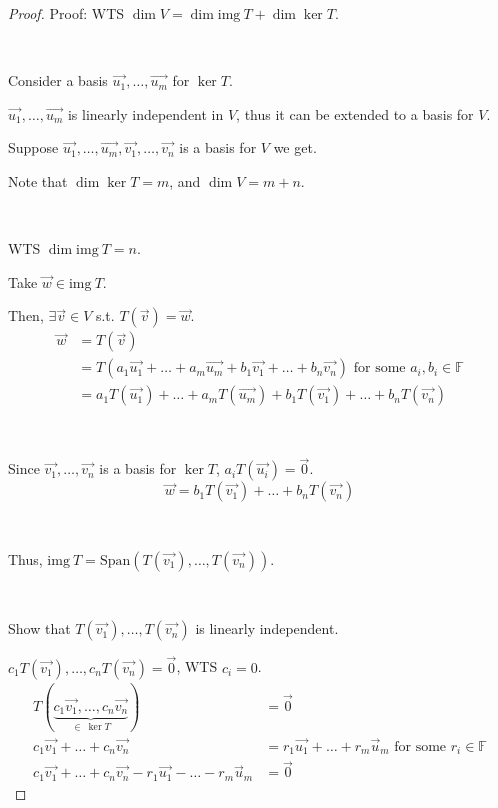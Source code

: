 \documentclass[11pt,fleqn]{book} %
\begin{document}
\begin{proof}
    Proof: WTS $\dim V = \dim \mathrm{img}~T + \dim \ker T$. 

    {~~~}
    
    Consider a basis $\overrightarrow{u_1}, \dots, \overrightarrow{u_m}$ for $\ker T$. 
    
    $\overrightarrow{u_1}, \dots, \overrightarrow{u_m}$ is linearly independent in $V$, thus it can be extended to a basis for $V$. 
    
    Suppose $\overrightarrow{u_1}, \dots, \overrightarrow{u_m}, \overrightarrow{v_1}, \dots, \overrightarrow{v_n}$ is a basis for $V$ we get. 

    Note that $\dim \ker T = m$, and $\dim V = m + n$. 
    
    {~~~}

    WTS $\dim \mathrm{img}~T = n$. 
    
    Take $\overrightarrow{w} \in \mathrm{img}~T$. 
    
    Then, $\exists \overrightarrow{v} \in V$ s.t. $T(\overrightarrow{v}) = \overrightarrow{w}$. 
    \begin{align*}  
        \overrightarrow{w}
        &=T(\overrightarrow{v})
        \\
        &= T(a_1\overrightarrow{u_1} + \dots + a_m\overrightarrow{u_m} + b_1\overrightarrow{v_1} + \dots + b_n\overrightarrow{v_n})
        \text{ for some }a_i, b_i \in \mathbb{F}
        \\
        &= a_1T(\overrightarrow{u_1}) + \dots + a_mT(\overrightarrow{u_m}) + b_1T(\overrightarrow{v_1}) + \dots + b_nT(\overrightarrow{v_n})
    \end{align*}
    
    {~~~}

    Since $\overrightarrow{v_1}, \dots, \overrightarrow{v_n}$ is a basis for $\ker T$, $a_iT(\overrightarrow{u_i}) = \overrightarrow{0}$. 
    $$\overrightarrow{w} = b_1T(\overrightarrow{v_1}) + \dots + b_nT(\overrightarrow{v_n})$$

    {~~~}

    Thus, $\mathrm{img}~T = \mathrm{Span}\left( T(\overrightarrow{v_1}), \dots, T(\overrightarrow{v_n}) \right)$. 

    {~~~}

    Show that $T(\overrightarrow{v_1}), \dots, T(\overrightarrow{v_n})$ is linearly independent. 
    
    $c_1 T(\overrightarrow{v_1}), \dots, c_nT(\overrightarrow{v_n}) = \overrightarrow{0}$, WTS $c_i = 0$. 
    \begin{align*}
        T ( \underbrace{c_1\overrightarrow{v_1}, \dots, c_n\overrightarrow{v_n}}_{\in~\ker T} ) 
        &= \overrightarrow{0}
        \\
        c_1\overrightarrow{v_1} + \dots + c_n\overrightarrow{v_n} 
        &= r_1\overrightarrow{u_1} + \dots + r_m\overrightarrow{u}_m \text{ for some } r_i \in \mathbb{F}
        \\
        c_1\overrightarrow{v_1} + \dots + c_n\overrightarrow{v_n} - r_1\overrightarrow{u_1} - \dots - r_m\overrightarrow{u}_m 
        &= \overrightarrow{0}
    \end{align*}
    

\end{proof}
\end{document}
